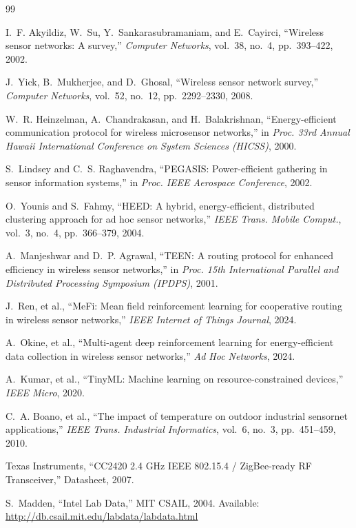 \documentclass[twocolumn]{article}
\begin{document}

\begin{thebibliography}{99}

I.~F. Akyildiz, W.~Su, Y.~Sankarasubramaniam, and E.~Cayirci,
``Wireless sensor networks: A survey,''
\emph{Computer Networks}, vol.~38, no.~4, pp.~393--422, 2002.

J.~Yick, B.~Mukherjee, and D.~Ghosal,
``Wireless sensor network survey,''
\emph{Computer Networks}, vol.~52, no.~12, pp.~2292--2330, 2008.

W.~R. Heinzelman, A.~Chandrakasan, and H.~Balakrishnan,
``Energy-efficient communication protocol for wireless microsensor networks,''
in \emph{Proc. 33rd Annual Hawaii International Conference on System Sciences
(HICSS)}, 2000.

S.~Lindsey and C.~S. Raghavendra,
``PEGASIS: Power-efficient gathering in sensor information systems,''
in \emph{Proc. IEEE Aerospace Conference}, 2002.

O.~Younis and S.~Fahmy,
``HEED: A hybrid, energy-efficient, distributed clustering approach for
ad hoc sensor networks,''
\emph{IEEE Trans. Mobile Comput.}, vol.~3, no.~4, pp.~366--379, 2004.

A.~Manjeshwar and D.~P. Agrawal,
``TEEN: A routing protocol for enhanced efficiency in wireless sensor networks,''
in \emph{Proc. 15th International Parallel and Distributed Processing
Symposium (IPDPS)}, 2001.

J.~Ren, et al.,
``MeFi: Mean field reinforcement learning for cooperative routing in
wireless sensor networks,''
\emph{IEEE Internet of Things Journal}, 2024.

A.~Okine, et al.,
``Multi-agent deep reinforcement learning for energy-efficient data
collection in wireless sensor networks,''
\emph{Ad Hoc Networks}, 2024.

A.~Kumar, et al.,
``TinyML: Machine learning on resource-constrained devices,''
\emph{IEEE Micro}, 2020.

C.~A. Boano, et al.,
``The impact of temperature on outdoor industrial sensornet applications,''
\emph{IEEE Trans. Industrial Informatics}, vol.~6, no.~3, pp.~451--459, 2010.

Texas Instruments,
``CC2420 2.4 GHz IEEE 802.15.4 / ZigBee-ready RF Transceiver,''
Datasheet, 2007.

S.~Madden,
``Intel Lab Data,''
MIT CSAIL, 2004.
Available: \url{http://db.csail.mit.edu/labdata/labdata.html}

\end{thebibliography}
\end{document}
